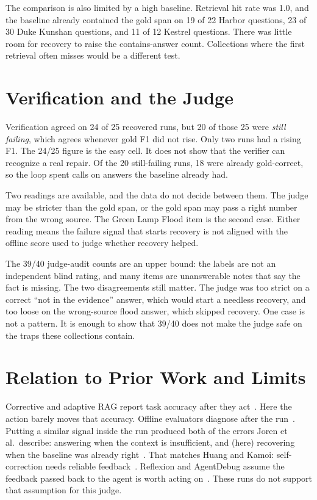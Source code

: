 \documentclass[12pt, a4paper, oneside]{report}
\begin{document}
The comparison is also limited by a high baseline. Retrieval hit rate was
1.0, and the baseline already contained the gold span on 19 of 22 Harbor
questions, 23 of 30 Duke Kunshan questions, and 11 of 12 Kestrel
questions. There was little room for recovery to raise the
contains-answer count. Collections where the first retrieval often
misses would be a different test.

\section{Verification and the Judge}

Verification agreed on 24 of 25 recovered runs, but 20 of those 25 were
\emph{still failing}, which agrees whenever gold F1 did not rise. Only
two runs had a rising F1. The 24/25 figure is the easy cell. It does not
show that the verifier can recognize a real repair. Of the 20
still-failing runs, 18 were already gold-correct, so the loop spent
calls on answers the baseline already had.

Two readings are available, and the data do not decide between them. The
judge may be stricter than the gold span, or the gold span may pass a
right number from the wrong source. The Green Lamp Flood item is the
second case. Either reading means the failure signal that starts
recovery is not aligned with the offline score used to judge whether
recovery helped.

The 39/40 judge-audit counts are an upper bound: the labels are not an
independent blind rating, and many items are unanswerable notes that say
the fact is missing. The two disagreements still matter. The judge was
too strict on a correct ``not in the evidence'' answer, which would start
a needless recovery, and too loose on the wrong-source flood answer,
which skipped recovery. One case is not a pattern. It is enough to show
that 39/40 does not make the judge safe on the traps these collections
contain.

\section{Relation to Prior Work and Limits}

Corrective and adaptive RAG report task accuracy after they
act~\cite{yan2024crag,asai2024selfrag,jiang2023flare,jeong2024adaptiverag}.
Here the action barely moves that accuracy. Offline evaluators diagnose
after the run~\cite{es2024ragas,saadfalcon2024ares,ru2024ragchecker}.
Putting a similar signal inside the run produced both of the errors
Joren et al.\ describe: answering when the context is insufficient, and
(here) recovering when the baseline was already
right~\cite{joren2025sufficient}. That matches Huang and Kamoi:
self-correction needs reliable
feedback~\cite{huang2024cannot,kamoi2024selfcorrection}. Reflexion and
AgentDebug assume the feedback passed back to the agent is worth acting
on~\cite{shinn2023reflexion,zhu2025agentdebug}. These runs do not
support that assumption for this judge.
\end{document}
